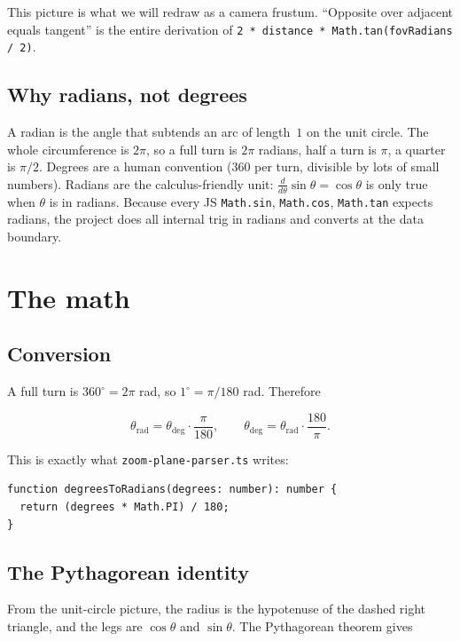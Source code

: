 \documentclass{article}
\begin{document}
This picture is what we will redraw as a camera frustum. ``Opposite over
adjacent equals tangent'' is the entire derivation of
\lstinline{2 * distance * Math.tan(fovRadians / 2)}.

\subsection{Why radians, not degrees}

A radian is the angle that subtends an arc of length~$1$ on the unit circle.
The whole circumference is $2\pi$, so a full turn is $2\pi$ radians, half a
turn is $\pi$, a quarter is $\pi/2$. Degrees are a human convention
($360$ per turn, divisible by lots of small numbers). Radians are the
calculus-friendly unit: $\frac{d}{d\theta}\sin\theta = \cos\theta$ is only
true when $\theta$ is in radians. Because every JS \lstinline{Math.sin},
\lstinline{Math.cos}, \lstinline{Math.tan} expects radians, the project does
all internal trig in radians and converts at the data boundary.

\section{The math}

\subsection{Conversion}

A full turn is $360^\circ = 2\pi$ rad, so $1^\circ = \pi/180$ rad. Therefore

\[
  \theta_{\text{rad}} = \theta_{\text{deg}} \cdot \frac{\pi}{180},
  \qquad
  \theta_{\text{deg}} = \theta_{\text{rad}} \cdot \frac{180}{\pi}.
\]

This is exactly what \texttt{zoom-plane-parser.ts} writes:

\begin{lstlisting}
function degreesToRadians(degrees: number): number {
  return (degrees * Math.PI) / 180;
}
\end{lstlisting}

\subsection{The Pythagorean identity}

From the unit-circle picture, the radius is the hypotenuse of the dashed right
triangle, and the legs are $\cos\theta$ and $\sin\theta$. The Pythagorean
theorem gives
\end{document}

